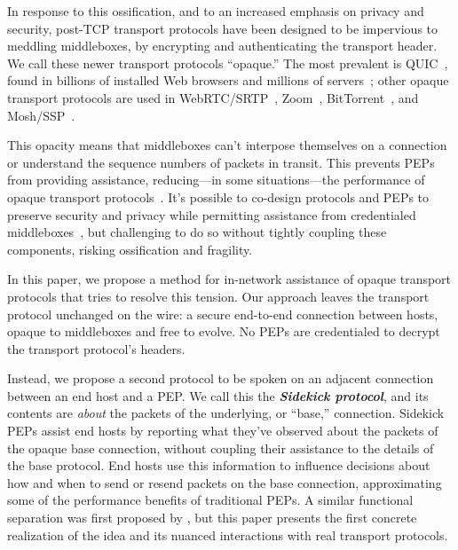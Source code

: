In response to this ossification, and to an increased emphasis on privacy and
security, post-TCP transport protocols have been designed to be impervious to
meddling middleboxes, by encrypting and authenticating the transport header. We
call these newer transport protocols ``opaque.'' The most prevalent is
QUIC~\cite{rfc9000}, found in billions of installed Web browsers and millions
of servers~\cite{zirngibl2021quicdeployment}; other opaque transport protocols
are used in WebRTC/SRTP~\cite{rfc8834webrtc}, Zoom~\cite
{zoom}, BitTorrent~\cite{bittorrent}, and Mosh/SSP~\cite{winstein2012mosh}.

This opacity means that middleboxes can't interpose themselves on a connection
or understand the sequence numbers of packets in transit.  This prevents PEPs
from providing assistance, reducing---in some situations---the performance of
opaque transport protocols~\cite
{border2020quicsat-presentation,kuhn2021quic-over-sat,martin2022bbr-quic-sat,border2020evaluating,kosek2022quicpep}.
It's possible to co-design protocols and PEPs to preserve security and privacy
while permitting assistance from credentialed middleboxes~\cite
{ford2008logjam,sherry2015blindbox, dogar2012tapa,iyengar2009flow}, but
challenging to do so without tightly coupling these components, risking
ossification and fragility.

In this paper, we propose a method for in-network assistance of opaque transport
protocols that tries to resolve this tension. Our approach leaves the transport
protocol unchanged on the wire: a secure end-to-end connection between hosts,
opaque to middleboxes and free to evolve. No PEPs are credentialed to decrypt
the transport protocol's headers.

Instead, we propose a second protocol to be spoken on an adjacent connection
between an end host and a PEP. We call this the \emph{\bf Sidekick protocol},
and its contents are \emph{about} the packets of the underlying, or ``base,''
connection. Sidekick PEPs assist end hosts by reporting what they've observed
about the packets of the opaque base connection, without coupling their
assistance to the details of the base protocol. End hosts use this information
to influence decisions about how and when to send or resend packets on the base
connection, approximating some of the performance benefits of traditional PEPs.
A similar functional separation was first proposed by \cite
{yuan2022sidecar}, but this paper presents the first concrete realization of
the idea and its nuanced interactions with real transport protocols.


